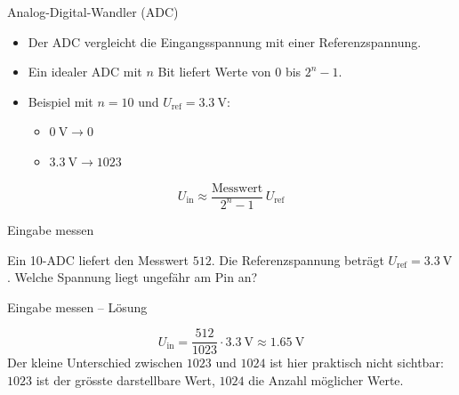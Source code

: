 \begin{frame}{Analog-Digital-Wandler (ADC)}
	\begin{itemize}[<+->]
		\item Der ADC vergleicht die Eingangsspannung mit einer Referenzspannung.
		\item Ein idealer ADC mit $n$ Bit liefert Werte von $0$ bis $2^n-1$.
		\item Beispiel mit $n=10$ und $U_\mathrm{ref}=\qty{3.3}{\volt}$:
		\begin{itemize}
			\item $\qty{0}{\volt}\rightarrow 0$
			\item $\qty{3.3}{\volt}\rightarrow 1023$
		\end{itemize}
	\end{itemize}
	\[
		U_\mathrm{in}\approx\frac{\text{Messwert}}{2^n-1}\,U_\mathrm{ref}
	\]
\end{frame}

\begin{frame}{Eingabe messen}
	\begin{myexercise}
		Ein \qty{10}{\bit}-ADC liefert den Messwert $512$. Die Referenzspannung beträgt
		$U_\mathrm{ref}=\qty{3.3}{\volt}$. Welche Spannung liegt ungefähr am Pin an?
	\end{myexercise}
\end{frame}

\begin{frame}{Eingabe messen -- Lösung}
	\begin{myanswer}
		\[
			U_\mathrm{in}=\frac{512}{1023}\cdot\qty{3.3}{\volt}
			\approx\qty{1.65}{\volt}
		\]
		Der kleine Unterschied zwischen $1023$ und $1024$ ist hier praktisch nicht sichtbar:
		$1023$ ist der grösste darstellbare Wert, $1024$ die Anzahl möglicher Werte.
	\end{myanswer}
\end{frame}

